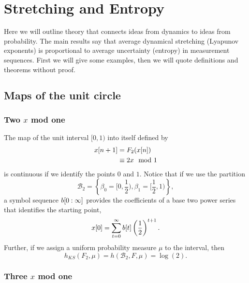 \section{Stretching and Entropy}
\label{sec:pesin}

Here we will outline theory that connects ideas from dynamics to ideas
from probability.  The main results say that average dynamical
stretching (Lyapunov exponents) is proportional to average uncertainty
(entropy) in measurement sequences.  First we will give some examples,
then we will quote definitions and theorems without proof.

\subsection{Maps of the unit circle}
\label{sec:PesinExamples}

\subsubsection{Two $x$ mod one}
\label{sec:TwoX}

The map of the unit interval $[0,1)$ into itself defined by
\begin{align}
  {x}{[n+1]} &= F_2({x}{[n]})\\
  \label{eq:twox}
  &\equiv 2x \mod 1
\end{align}
is continuous if we identify the points $0$ and $1$.  Notice that if
we use the partition
\begin{equation}
  \label{eq:partition2}
  \mathcal{B}_2 = \left\{ \beta_0 = [0,\frac{1}{2}),\beta_1 =
  [\frac{1}{2}, 1 )\right\},  
\end{equation}
a symbol sequence $b[0:\infty]$ provides the coefficients of a
base two power series that identifies the starting point, \ie
\begin{equation*}
  {x}{[0]} = \sum_{t=0}^\infty  {b}{[t]} \left(\frac{1}{2}\right)^{t+1}.
\end{equation*}
Further, if we assign a uniform probability measure $\mu$ to the
interval, then
\begin{equation*}
  h_{KS}(F_2,\mu) =h(\mathcal{B}_2,F,\mu) = \log(2).
\end{equation*}

\subsubsection{Three $x$ mod one}
\label{sec:ThreeX}

